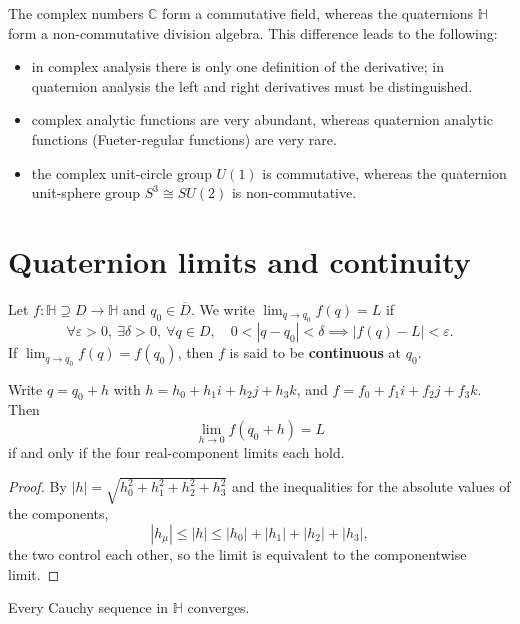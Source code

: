 \begin{remark}\label{rem:q_vs_complex}
The complex numbers $\mathbb{C}$ form a commutative field, whereas the quaternions $\mathbb{H}$ form a non-commutative division algebra. This difference leads to the following:
\begin{itemize}
    \item in complex analysis there is only one definition of the derivative; in quaternion analysis the left and right derivatives must be distinguished.
    \item complex analytic functions are very abundant, whereas quaternion analytic functions (Fueter-regular functions) are very rare.
    \item the complex unit-circle group $U(1)$ is commutative, whereas the quaternion unit-sphere group $S^3\cong SU(2)$ is non-commutative.
\end{itemize}
\end{remark}

\section{Quaternion limits and continuity}

\begin{definition}\label{def:q_limit}
Let $f:\mathbb{H}\supseteq D\to\mathbb{H}$ and $q_0\in\overline{D}$. We write $\lim_{q\to q_0}f(q)=L$ if
\[
\forall \varepsilon>0,\ \exists \delta>0,\ \forall q\in D,\quad 0<|q-q_0|<\delta\implies |f(q)-L|<\varepsilon.
\]
If $\lim_{q\to q_0}f(q)=f(q_0)$, then $f$ is said to be \textbf{continuous} at $q_0$.
\end{definition}

\begin{proposition}\label{prop:q_limit_coordinate}
Write $q=q_0+h$ with $h=h_0+h_1i+h_2j+h_3k$, and $f=f_0+f_1i+f_2j+f_3k$. Then
\[
\lim_{h\to 0}f(q_0+h)=L
\]
if and only if the four real-component limits each hold.
\end{proposition}

\begin{proof}
By $|h|=\sqrt{h_0^2+h_1^2+h_2^2+h_3^2}$ and the inequalities for the absolute values of the components,
\[
|h_\mu|\le |h|\le |h_0|+|h_1|+|h_2|+|h_3|,
\]
the two control each other, so the limit is equivalent to the componentwise limit.
\end{proof}

\begin{theorem}\label{thm:q_completeness}
Every Cauchy sequence in $\mathbb{H}$ converges.
\end{theorem}

